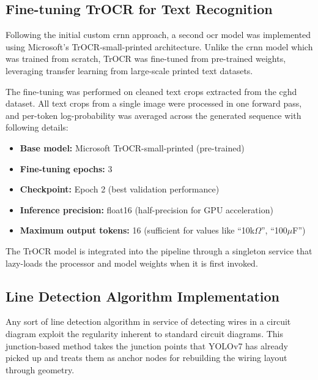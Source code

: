 \subsection{Fine-tuning TrOCR for Text Recognition}

Following the initial custom \gls{crnn} approach, a second \gls{ocr} model was implemented using Microsoft's TrOCR-small-printed architecture. Unlike the \gls{crnn} model which was trained from scratch, TrOCR was fine-tuned from pre-trained weights, leveraging transfer learning from large-scale printed text datasets.

The fine-tuning was performed on cleaned text crops extracted from the \gls{cghd} dataset. All text crops from a single image were processed in one forward pass, and per-token log-probability was averaged across the generated sequence with following details:

\begin{itemize}
    \item \textbf{Base model:} Microsoft TrOCR-small-printed (pre-trained)
    \item \textbf{Fine-tuning epochs:} 3
    \item \textbf{Checkpoint:} Epoch 2 (best validation performance)
    \item \textbf{Inference precision:} float16 (half-precision for GPU acceleration)
    \item \textbf{Maximum output tokens:} 16 (sufficient for values like ``10k$\Omega$'', ``100$\mu$F'')
\end{itemize}

The TrOCR model is integrated into the pipeline through a singleton service that lazy-loads the processor and model weights when it is first invoked.

\subsection{Line Detection Algorithm Implementation}

Any sort of line detection algorithm in service of detecting wires in a circuit diagram exploit the regularity inherent to standard circuit diagrams. This junction-based method takes the junction points that YOLOv7 has already picked up and treats them as anchor nodes for rebuilding the wiring layout through geometry.

